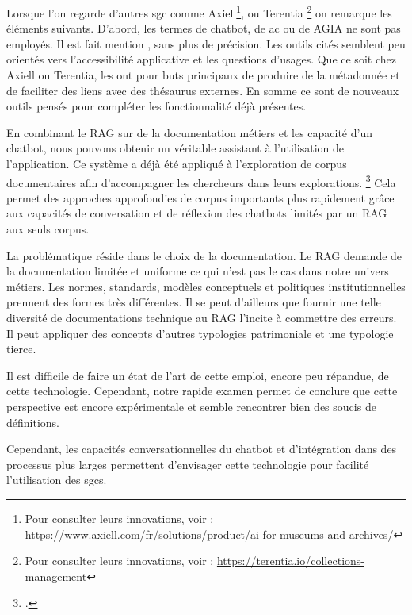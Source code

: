 Lorsque l'on regarde d'autres \gls{sgc} comme Axiell\footnote{Pour consulter leurs innovations, voir : \url{https://www.axiell.com/fr/solutions/product/ai-for-museums-and-archives/}}, ou Terentia \footnote{Pour consulter leurs innovations, voir : \url{https://terentia.io/collections-management}} on remarque les éléments suivants. D'abord, les termes de \gls{chatbot}, de \gls{ac} ou de \gls{AGIA} ne sont pas employés. Il est fait mention , sans plus de précision. Les outils cités semblent peu orientés vers l'accessibilité applicative et les questions d'usages. Que ce soit chez Axiell ou Terentia, les  ont pour buts principaux de produire de la métadonnée et de faciliter des liens avec des thésaurus externes. En somme ce sont de nouveaux outils pensés pour compléter les fonctionnalité déjà présentes.

En combinant le \gls{RAG} sur de la documentation métiers et les capacité d'un \gls{chatbot}, nous pouvons obtenir un véritable assistant à l'utilisation de l'application. Ce système a déjà été appliqué à l'exploration de corpus documentaires afin d'accompagner les chercheurs dans leurs explorations. \footcite{tuzaInterrogerMemoireDentreprise2025} Cela permet des approches approfondies de corpus importants plus rapidement grâce aux capacités de conversation et de réflexion des \glspl{chatbot} limités par un \gls{RAG} aux seuls corpus.\newline

La problématique réside dans le choix de la documentation. Le \gls{RAG} demande de la documentation limitée et uniforme ce qui n'est pas le cas dans notre univers métiers. Les normes, standards, modèles conceptuels et politiques institutionnelles prennent des formes très différentes. Il se peut d'ailleurs que fournir une telle diversité de documentations technique au \gls{RAG} l'incite à commettre des erreurs. Il peut appliquer des concepts d'autres typologies patrimoniale et une typologie tierce.\newline

Il est difficile de faire un état de l'art de cette emploi, encore peu répandue, de cette technologie. Cependant, notre rapide examen permet de conclure que cette perspective est encore expérimentale et semble rencontrer bien des soucis de définitions.

Cependant, les capacités conversationnelles du \gls{chatbot} et d'intégration dans des processus plus larges permettent d'envisager cette technologie pour facilité l'utilisation des \glspl{sgc}.